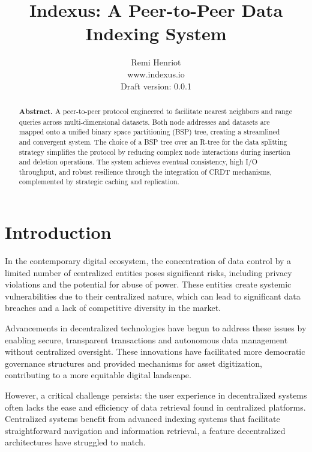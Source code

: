 \documentclass[11pt]{article}
\begin{document}
\title{Indexus: A Peer-to-Peer Data Indexing System}
\author{Remi Henriot  \\
        www.indexus.io \\
        Draft version: 0.0.1}
\date{}

\maketitle

\begin{abstract}
\noindent \textbf{Abstract. }A peer-to-peer protocol engineered to facilitate nearest neighbors and range queries across multi-dimensional datasets. Both node addresses and datasets are mapped onto a unified binary space partitioning (BSP) tree, creating a streamlined and convergent system. The choice of a BSP tree over an R-tree for the data splitting strategy simplifies the protocol by reducing complex node interactions during insertion and deletion operations. The system achieves eventual consistency, high I/O throughput, and robust resilience through the integration of CRDT mechanisms, complemented by strategic caching and replication.
\vspace{1em}\end{abstract}

\section*{Introduction}
In the contemporary digital ecosystem, the concentration of data control by a limited number of centralized entities poses significant risks, including privacy violations and the potential for abuse of power. These entities create systemic vulnerabilities due to their centralized nature, which can lead to significant data breaches and a lack of competitive diversity in the market.

Advancements in decentralized technologies have begun to address these issues by enabling secure, transparent transactions and autonomous data management without centralized oversight. These innovations have facilitated more democratic governance structures and provided mechanisms for asset digitization, contributing to a more equitable digital landscape.

However, a critical challenge persists: the user experience in decentralized systems often lacks the ease and efficiency of data retrieval found in centralized platforms. Centralized systems benefit from advanced indexing systems that facilitate straightforward navigation and information retrieval, a feature decentralized architectures have struggled to match.
\end{document}
